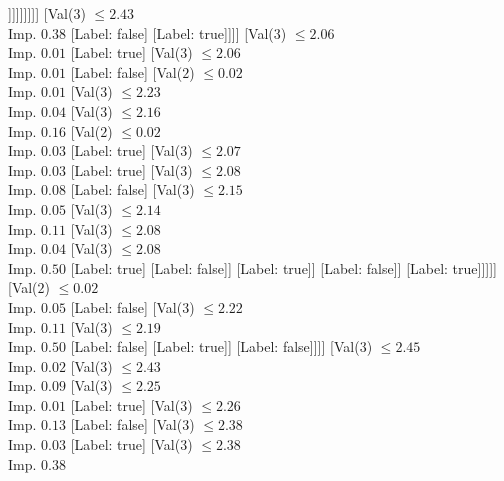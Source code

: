 \documentclass[margin=10pt]{standalone}
\begin{document}
\begin{forest}
																			]]]]]]]]
											[Val($3$) $ \leq 2.43$ \\ Imp. $0.38$
												[Label: false]
												[Label: true]]]]
									[Val($3$) $ \leq 2.06$ \\ Imp. $0.01$
										[Label: true]
										[Val($3$) $ \leq 2.06$ \\ Imp. $0.01$
											[Label: false]
											[Val($2$) $ \leq 0.02$ \\ Imp. $0.01$
												[Val($3$) $ \leq 2.23$ \\ Imp. $0.04$
													[Val($3$) $ \leq 2.16$ \\ Imp. $0.16$
														[Val($2$) $ \leq 0.02$ \\ Imp. $0.03$
															[Label: true]
															[Val($3$) $ \leq 2.07$ \\ Imp. $0.03$
																[Label: true]
																[Val($3$) $ \leq 2.08$ \\ Imp. $0.08$
																	[Label: false]
																	[Val($3$) $ \leq 2.15$ \\ Imp. $0.05$
																		[Val($3$) $ \leq 2.14$ \\ Imp. $0.11$
																			[Val($3$) $ \leq 2.08$ \\ Imp. $0.04$
																				[Val($3$) $ \leq 2.08$ \\ Imp. $0.50$
																					[Label: true]
																					[Label: false]]
																				[Label: true]]
																			[Label: false]]
																		[Label: true]]]]]
														[Val($2$) $ \leq 0.02$ \\ Imp. $0.05$
															[Label: false]
															[Val($3$) $ \leq 2.22$ \\ Imp. $0.11$
																[Val($3$) $ \leq 2.19$ \\ Imp. $0.50$
																	[Label: false]
																	[Label: true]]
																[Label: false]]]]
													[Val($3$) $ \leq 2.45$ \\ Imp. $0.02$
														[Val($3$) $ \leq 2.43$ \\ Imp. $0.09$
															[Val($3$) $ \leq 2.25$ \\ Imp. $0.01$
																[Label: true]
																[Val($3$) $ \leq 2.26$ \\ Imp. $0.13$
																	[Label: false]
																	[Val($3$) $ \leq 2.38$ \\ Imp. $0.03$
																		[Label: true]
																		[Val($3$) $ \leq 2.38$ \\ Imp. $0.38$

\end{forest}
\end{document}

